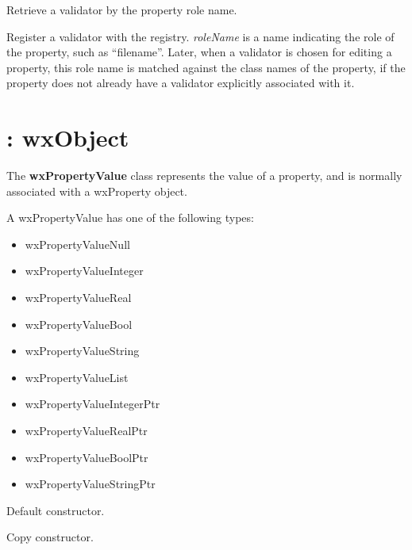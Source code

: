 Retrieve a validator by the property role name.

\label{wxpropertyvalidatorregistervalidator}


Register a validator with the registry. {\it roleName} is a name indicating the
role of the property, such as ``filename''. Later, when a validator is chosen for
editing a property, this role name is matched against the class names of the property,
if the property does not already have a validator explicitly associated with it.


\section{: wxObject}\label{wxpropertyvalue}

The {\bf wxPropertyValue} class represents the value of a property,
and is normally associated with a wxProperty object.

A wxPropertyValue has one of the following types:

\begin{itemize}\itemsep=0pt
\item wxPropertyValueNull
\item wxPropertyValueInteger
\item wxPropertyValueReal
\item wxPropertyValueBool
\item wxPropertyValueString
\item wxPropertyValueList
\item wxPropertyValueIntegerPtr
\item wxPropertyValueRealPtr
\item wxPropertyValueBoolPtr
\item wxPropertyValueStringPtr
\end{itemize}



Default constructor.


Copy constructor.


